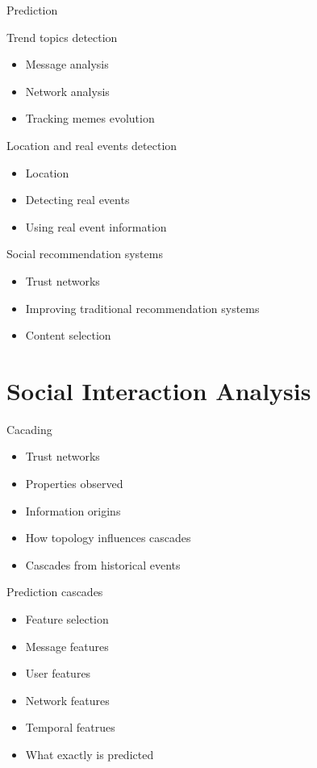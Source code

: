 \documentclass[8pt]{beamer}
\begin{document}
  \begin{frame}{Prediction}
  \end{frame}

  \begin{frame}{Trend topics detection}
    \begin{itemize}
      \item Message analysis
      \item Network analysis
      \item Tracking memes evolution
    \end{itemize}
  \end{frame}

  \begin{frame}{Location and real events detection}
    \begin{itemize}
      \item Location
      \item Detecting real events
      \item Using real event information
    \end{itemize}
  \end{frame}

  \begin{frame}{Social recommendation systems}
    \begin{itemize}
      \item Trust networks
      \item Improving traditional recommendation systems
      \item Content selection
    \end{itemize}
  \end{frame}
  
  \section{Social Interaction Analysis}
  \begin{frame}{Cacading}
    \begin{itemize}
      \item Trust networks
      \item Properties observed
      \item Information origins
      \item How topology influences cascades
      \item Cascades from historical events
    \end{itemize}
  \end{frame}

  \begin{frame}{Prediction cascades}
    \begin{itemize}
      \item Feature selection
      \item Message features
      \item User features
      \item Network features
      \item Temporal featrues
      \item What exactly is predicted
    \end{itemize}
  \end{frame}
\end{document}
